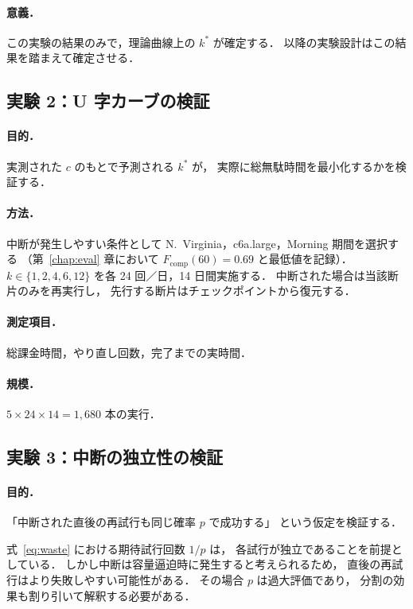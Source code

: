 \documentclass[11pt,a4paper]{ltjsreport}
\newcommand{\Fcomp}{F_{\mathrm{comp}}}
\begin{document}
\paragraph{意義．}
この実験の結果のみで，理論曲線上の $k^{*}$ が確定する．
以降の実験設計はこの結果を踏まえて確定させる．

\subsection{実験 2：U 字カーブの検証}

\paragraph{目的．}
実測された $c$ のもとで予測される $k^{*}$ が，
実際に総無駄時間を最小化するかを検証する．

\paragraph{方法．}
中断が発生しやすい条件として
N.~Virginia，c6a.large，Morning 期間を選択する
（第~\ref{chap:eval} 章において $\Fcomp(60) = 0.69$ と最低値を記録）．
$k \in \{1,2,4,6,12\}$ を各 24 回／日，14 日間実施する．
中断された場合は当該断片のみを再実行し，
先行する断片はチェックポイントから復元する．

\paragraph{測定項目．}
総課金時間，やり直し回数，完了までの実時間．

\paragraph{規模．}
$5 \times 24 \times 14 = 1{,}680$ 本の実行．

\subsection{実験 3：中断の独立性の検証}

\paragraph{目的．}
「中断された直後の再試行も同じ確率 $p$ で成功する」
という仮定を検証する．

式~\eqref{eq:waste} における期待試行回数 $1/p$ は，
各試行が独立であることを前提としている．
しかし中断は容量逼迫時に発生すると考えられるため，
直後の再試行はより失敗しやすい可能性がある．
その場合 $p$ は過大評価であり，
分割の効果も割り引いて解釈する必要がある．
\end{document}
